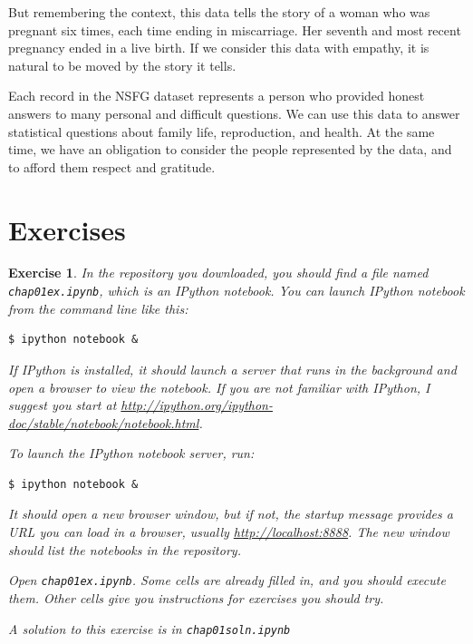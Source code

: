 \documentclass[12pt]{book}
\theoremstyle{exercise}
\newtheorem{exercise}{Exercise}[chapter]
\begin{document}
But remembering the context, this data tells the story of a woman who
was pregnant six times, each time ending in miscarriage.  Her seventh
and most recent pregnancy ended in a live birth.  If we consider this
data with empathy, it is natural to be moved by the story it tells.

Each record in the NSFG dataset represents a person who provided
honest answers to many personal and difficult questions.  We can use
this data to answer statistical questions about family life,
reproduction, and health.  At the same time, we have an obligation
to consider the people represented by the data, and to afford them
respect and gratitude.%


\section{Exercises}

\begin{exercise}
In the repository you downloaded, you should find a file named
\verb"chap01ex.ipynb", which is an IPython notebook.  You can
launch IPython notebook from the command line like this:%

\begin{verbatim}
$ ipython notebook &
\end{verbatim}

If IPython is installed, it should launch a server that runs in the
background and open a browser to view the notebook.  If you are not
familiar with IPython, I suggest you start at
\url{http://ipython.org/ipython-doc/stable/notebook/notebook.html}.

To launch the IPython notebook server, run:

\begin{verbatim}
$ ipython notebook &
\end{verbatim}

It should open a new browser window, but if not, the startup
message provides a URL you can load in a browser, usually
\url{http://localhost:8888}.  The new window should list the notebooks
in the repository.

Open \verb"chap01ex.ipynb".  Some cells are already filled in, and
you should execute them.  Other cells give you instructions for
exercises you should try.

A solution to this exercise is in \verb"chap01soln.ipynb"
\end{exercise}
\end{document}
